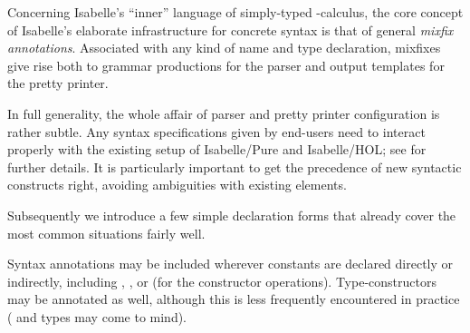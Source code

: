 %
\begin{isabellebody}%
\def\isabellecontext{Documents}%
\isamarkupfalse%
%
\isamarkuptrue%
%
\begin{isamarkuptext}%
Concerning Isabelle's ``inner'' language of simply-typed \isa{{\isasymlambda}}-calculus, the core concept of Isabelle's elaborate infrastructure
  for concrete syntax is that of general \emph{mixfix
  annotations}.  Associated with any
  kind of name and type declaration, mixfixes give rise both to
  grammar productions for the parser and output templates for the
  pretty printer.

  In full generality, the whole affair of parser and pretty printer
  configuration is rather subtle.  Any syntax specifications given by
  end-users need to interact properly with the existing setup of
  Isabelle/Pure and Isabelle/HOL; see \cite{isabelle-ref} for further
  details.  It is particularly important to get the precedence of new
  syntactic constructs right, avoiding ambiguities with existing
  elements.

  \medskip Subsequently we introduce a few simple declaration forms
  that already cover the most common situations fairly well.%
\end{isamarkuptext}%
\isamarkuptrue%
%
\isamarkuptrue%
%
\begin{isamarkuptext}%
Syntax annotations may be included wherever constants are declared
  directly or indirectly, including ,
  , or  (for the
  constructor operations).  Type-constructors may be annotated as
  well, although this is less frequently encountered in practice
  (\isa{{\isacharasterisk}} and \isa{{\isacharplus}} types may come to mind).


\end{isamarkuptext}
\end{isabellebody}
